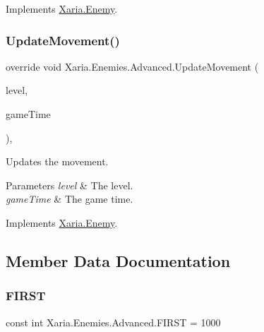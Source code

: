 Implements \hyperlink{classXaria_1_1Enemy_a229b595e96e1429a9e9b1d9816d4370b}{Xaria.\+Enemy}.

\mbox{\label{classXaria_1_1Enemies_1_1Advanced_a1b3201d7cb5a9aeb8c6bf3fa99b0e194}} 
\subsubsection{\texorpdfstring{Update\+Movement()}{UpdateMovement()}}
{\footnotesize\ttfamily override void Xaria.\+Enemies.\+Advanced.\+Update\+Movement (\begin{DoxyParamCaption}\item[{\hyperlink{classXaria_1_1Level}{Level}}]{level,  }\item[{Game\+Time}]{game\+Time }\end{DoxyParamCaption})\hspace{0.3cm}{\ttfamily [inline]}, {\ttfamily [virtual]}}



Updates the movement. 


\begin{DoxyParams}{Parameters}
{\em level} & The level.\\
\hline
{\em game\+Time} & The game time.\\
\hline
\end{DoxyParams}


Implements \hyperlink{classXaria_1_1Enemy_abe1058263c5512b5e098e73d3b6d704c}{Xaria.\+Enemy}.



\subsection{Member Data Documentation}
\mbox{\label{classXaria_1_1Enemies_1_1Advanced_a1efb1e1025b39108f6e21e2693c722ff}} 
\subsubsection{\texorpdfstring{F\+I\+R\+ST}{FIRST}}
{\footnotesize\ttfamily const int Xaria.\+Enemies.\+Advanced.\+F\+I\+R\+ST = 1000\hspace{0.3cm}{\ttfamily [private]}}



